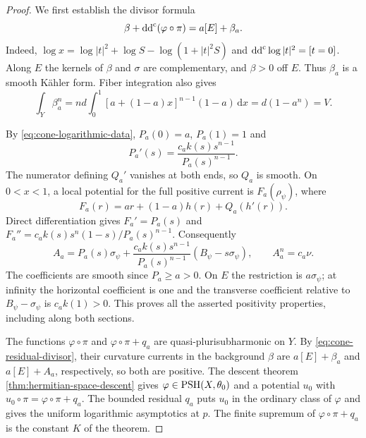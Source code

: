 \begin{proof}
We first establish the divisor formula
\begin{equation}\label{eq:cone-residual-divisor}
\beta+\mathrm{dd}^{\mathrm{c}}(\varphi\circ\pi)=a[E]+\beta_a.
\end{equation}
Indeed, $\log x=\log|t|^2+\log S-\log(1+|t|^2S)$ and $\mathrm{dd}^{\mathrm{c}}\log|t|^2=[t=0]$. Along $E$ the kernels of $\beta$ and $\sigma$ are complementary, and $\beta>0$ off $E$. Thus $\beta_a$ is a smooth K\"ahler form. Fiber integration also gives
\begin{equation}\label{eq:cone-logarithmic-mass}
\int_Y\beta_a^n=nd\int_0^1[a+(1-a)x]^{n-1}(1-a)\,\mathrm{d} x=d(1-a^n)=V.
\end{equation}

By \eqref{eq:cone-logarithmic-data}, $P_a(0)=a$, $P_a(1)=1$ and
\[
P_a'(s)=\frac{c_a k(s)s^{n-1}}{P_a(s)^{n-1}}.
\]
The numerator defining $Q_a'$ vanishes at both ends, so $Q_a$ is smooth. On $0<x<1$, a local potential for the full positive current is $F_a(\rho_\psi)$, where
\[
F_a(r)=ar+(1-a)h(r)+Q_a(h'(r)).
\]
Direct differentiation gives $F_a'=P_a(s)$ and $F_a''=c_a k(s)s^n(1-s)/P_a(s)^{n-1}$. Consequently
\begin{equation}\label{eq:cone-solved-logarithmic-form}
A_a=P_a(s)\sigma_\psi+\frac{c_a k(s)s^{n-1}}{P_a(s)^{n-1}}(B_\psi-s\sigma_\psi),\qquad A_a^n=c_a\nu.
\end{equation}
The coefficients are smooth since $P_a\geq a>0$. On $E$ the restriction is $a\sigma_\psi$; at infinity the horizontal coefficient is one and the transverse coefficient relative to $B_\psi-\sigma_\psi$ is $c_a k(1)>0$. This proves all the asserted positivity properties, including along both sections.

The functions $\varphi\circ\pi$ and $\varphi\circ\pi+q_a$ are quasi-plurisubharmonic on $Y$. By \eqref{eq:cone-residual-divisor}, their curvature currents in the background $\beta$ are $a[E]+\beta_a$ and $a[E]+A_a$, respectively, so both are positive. The descent theorem \cref{thm:hermitian-space-descent} gives $\varphi\in\mathrm{PSH}(X,\theta_0)$ and a potential $u_0$ with $u_0\circ\pi=\varphi\circ\pi+q_a$. The bounded residual $q_a$ puts $u_0$ in the ordinary class of $\varphi$ and gives the uniform logarithmic asymptotics at $p$. The finite supremum of $\varphi\circ\pi+q_a$ is the constant $K$ of the theorem.


\end{proof}

